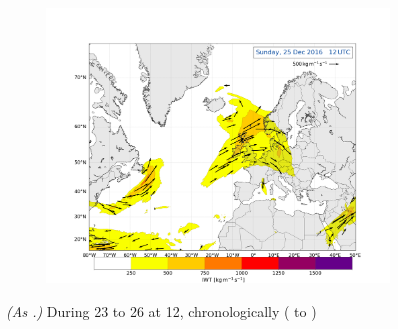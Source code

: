 \begin{figure}[t!]
\begin{subfigure}[b]{\textwidth}
		\includegraphics[trim={4.2cm 0cm 4.3cm 36.8cm},clip,
		width=\textwidth]{./fig_Atm_Riv/20161225_12}
	\end{subfigure}
	\caption{\textit{(As .)} During \num{23} to \SI{26}{\dec} at \SI{12}{\UTC}, chronologically (\protect{} to \protect{})} \label{fig:AtmRiv_01}
\end{figure}

